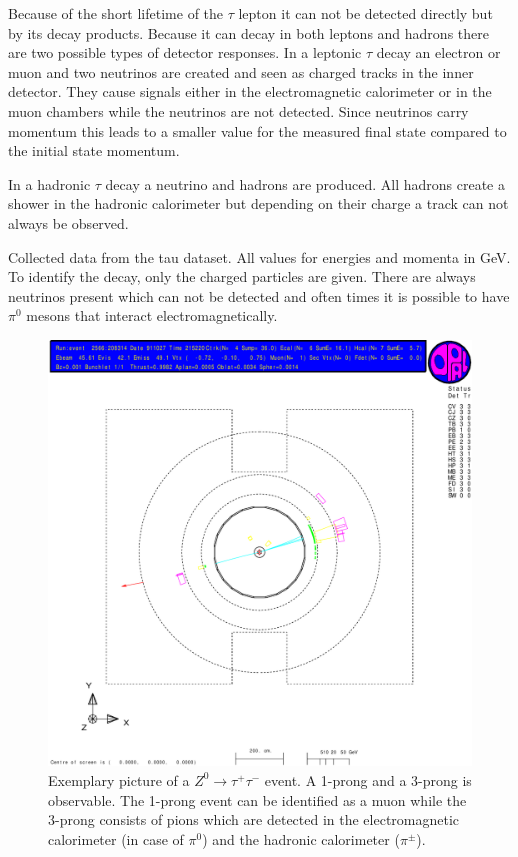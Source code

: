 \documentclass[11pt, a4paper]{article}
\numberwithin{equation}{section}
\begin{document}
Because of the short lifetime of the $\tau$ lepton it can not be detected directly but by its decay products.
Because it can decay in both leptons and hadrons there are two possible types of detector responses.
In a leptonic $\tau$ decay an electron or muon and two neutrinos are created and seen as charged tracks in the inner detector.
They cause signals either in the electromagnetic calorimeter or in the muon chambers while the neutrinos are not detected.
Since neutrinos carry momentum this leads to a smaller value for the measured final state compared to the initial state momentum.

In a hadronic $\tau$ decay a neutrino and hadrons are produced.
All hadrons create a shower in the hadronic calorimeter but depending on their charge a track can not always be observed.
\begin{table}
	\centering
	\resizebox{\textwidth}{!}{
		
	}
	\caption{Collected data from the tau dataset. All values for energies and momenta in \si{GeV}. To identify the decay, only the charged particles are given. There are always neutrinos present which can not be detected and often times it is possible to have $\pi^0$ mesons that interact electromagnetically.}
\end{table}
\begin{figure}[h]
	\centering
	\includegraphics[width=\textwidth]{./data/tag1/tt_pics/cropped/tt_05}
	\caption{Exemplary picture of a $Z^0\rightarrow \tau^+\tau^-$ event. A 1-prong and a 3-prong is observable. The 1-prong event can be identified as a muon while the 3-prong consists of pions which are detected in the electromagnetic calorimeter (in case of $\pi^0$) and the hadronic calorimeter ($\pi^\pm$).}
\end{figure}
\clearpage
\end{document}
